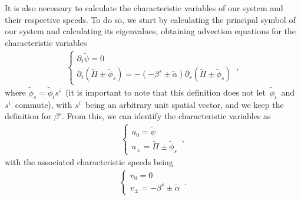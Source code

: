 It is also necessary to calculate the characteristic variables of our system and their respective speeds. To do so, we start by calculating the principal symbol of our system and calculating its eigenvalues, obtaining advection equations for the characteristic variables
%
\begin{align}
    \begin{cases}
        \partial_t \tilde{\psi} = 0 \\
        \partial_t (\tilde{\Pi} \pm \tilde{\phi}_s) = - (-\beta^s \pm \tilde{\alpha}) \partial_s (\tilde{\Pi} \pm \tilde{\phi}_s)
    \end{cases}\,,
\end{align}
%
where $\tilde{\phi}_s = \tilde{\phi}_i s^i$~(it is important to note that this definition does not let~$\tilde{\phi}_i$~and~$s^i$~commute), with $s^i$~being an arbitrary unit spatial vector, and we keep the definition for $\beta^s$. From this, we can identify the characteristic variables as 
%
\begin{align}
    \begin{cases}
        u_0 = \tilde{\psi} \\
        u_\pm = \tilde{\Pi} \pm \tilde{\phi}_s
    \end{cases}\,,
\end{align}
%
with the associated characteristic speeds being
%
\begin{align}
    \begin{cases}
        v_0 = 0 \\
        v_\pm = -\beta^s \pm \tilde{\alpha}
    \end{cases}\,.
\end{align}

